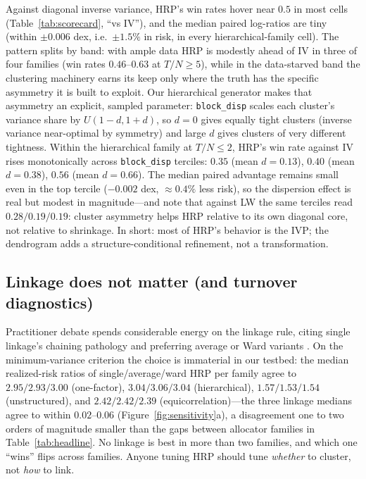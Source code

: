 \documentclass[11pt]{article}
\newcommand{\TN}{T/N}
\begin{document}
Against diagonal inverse variance, HRP's win rates hover near $0.5$ in most
cells (Table~\ref{tab:scorecard}, ``vs IV''), and the median paired
log-ratios are tiny (within $\pm0.006$ dex, i.e.\ $\pm1.5\%$ in risk, in
every hierarchical-family cell). The pattern splits by band: with ample data
HRP is modestly ahead of IV in three of four families (win rates
$0.46$--$0.63$ at $\TN\ge5$), while in the data-starved band the clustering
machinery earns its keep only where the truth has the specific asymmetry it
is built to exploit. Our
hierarchical generator makes that asymmetry an explicit, sampled parameter:
\texttt{block\_disp} scales each cluster's variance share by
$U(1-d,1+d)$, so $d=0$ gives equally tight clusters (inverse variance
near-optimal by symmetry) and large $d$ gives clusters of very different
tightness. Within the hierarchical family at $\TN\le2$, HRP's win rate
against IV rises monotonically across \texttt{block\_disp} terciles: $0.35$
(mean $d=0.13$), $0.40$ (mean $d=0.38$), $0.56$ (mean $d=0.66$). The median
paired advantage remains small even in the top tercile ($-0.002$ dex,
${\approx}0.4\%$ less risk), so the dispersion effect is real but modest in
magnitude---and note that against LW the same terciles read
$0.28/0.19/0.19$: cluster asymmetry helps HRP relative to its own diagonal
core, not relative to shrinkage. In short: most of HRP's behavior is the
IVP; the dendrogram adds a structure-conditional refinement, not a
transformation.

\subsection{Linkage does not matter (and turnover diagnostics)}
\label{sec:linkage}

Practitioner debate spends considerable energy on the linkage rule, citing
single linkage's chaining pathology \citep{murtagh2012algorithms} and
preferring average or Ward variants \citep{raffinot2017hierarchical}. On the
minimum-variance criterion the choice is immaterial in our testbed: the
median realized-risk ratios of single/average/ward HRP per family agree to
$2.95/2.93/3.00$ (one-factor), $3.04/3.06/3.04$ (hierarchical),
$1.57/1.53/1.54$ (unstructured), and $2.42/2.42/2.39$
(equicorrelation)---the three linkage medians agree to within
$0.02$--$0.06$ (Figure~\ref{fig:sensitivity}a), a disagreement one to two
orders of magnitude smaller than the gaps between allocator families in
Table~\ref{tab:headline}. No linkage is best in more than two families, and
which one ``wins'' flips across families. Anyone tuning HRP should tune
\emph{whether} to cluster, not \emph{how} to link.
\end{document}
